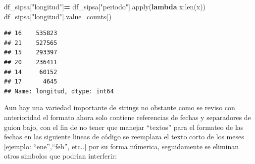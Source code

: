 \documentclass[
]{book}
\newenvironment{Shaded}{\begin{snugshade}}{\end{snugshade}}
\newcommand{\BuiltInTok}[1]{#1}
\newcommand{\KeywordTok}[1]{\textcolor[rgb]{0.13,0.29,0.53}{\textbf{#1}}}
\newcommand{\NormalTok}[1]{#1}
\newcommand{\OperatorTok}[1]{\textcolor[rgb]{0.81,0.36,0.00}{\textbf{#1}}}
\newcommand{\StringTok}[1]{\textcolor[rgb]{0.31,0.60,0.02}{#1}}
\begin{document}
\begin{Shaded}
\begin{Highlighting}[]

\NormalTok{df\_sipsa[}\StringTok{"longitud"}\NormalTok{]}\OperatorTok{=}\NormalTok{ df\_sipsa[}\StringTok{"periodo"}\NormalTok{].}\BuiltInTok{apply}\NormalTok{(}\KeywordTok{lambda}\NormalTok{ x:}\BuiltInTok{len}\NormalTok{(x))}
\NormalTok{df\_sipsa[}\StringTok{"longitud"}\NormalTok{].value\_counts()}
\end{Highlighting}
\end{Shaded}

\begin{verbatim}
## 16    535823
## 21    527565
## 15    293397
## 20    236411
## 14     60152
## 17      4645
## Name: longitud, dtype: int64
\end{verbatim}

Aun hay una variedad importante de strings no obstante como se reviso con anterioridad el formato ahora solo contiene referencias de fechas y separadores de guion bajo, con el fin de no tener que manejar ``textos'' para el formateo de las fechas en las siguiente lineas de código se reemplaza el texto corto de los meses {[}ejemplo: ``ene'',``feb'', etc..{]} por su forma númerica, seguidamente se eliminan otros simbolos que podrian interferir:
\end{document}
